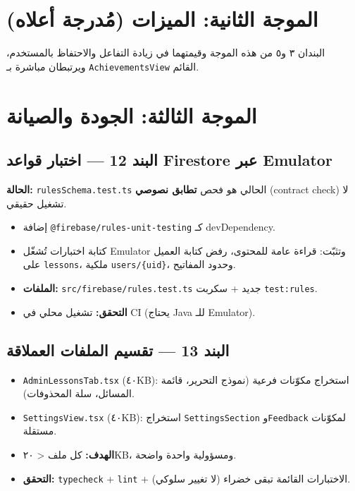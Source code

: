 \documentclass[11pt]{article}
\begin{document}
\section{الموجة الثانية: الميزات (مُدرجة أعلاه)}

البندان ٣ و٥ من هذه الموجة وقيمتهما في زيادة التفاعل والاحتفاظ بالمستخدم،
ويرتبطان مباشرة بـ \texttt{AchievementsView} القائم.

\section{الموجة الثالثة: الجودة والصيانة}

\subsection{البند 12 — اختبار قواعد Firestore عبر Emulator}

\begin{notebox}
\textbf{الحالة:} \texttt{rulesSchema.test.ts} الحالي هو فحص \textbf{تطابق نصوصي} (contract check) لا تشغيل حقيقي.
\end{notebox}

\begin{itemize}
  \item إضافة \texttt{@firebase/rules-unit-testing} كـ devDependency.
  \item كتابة اختبارات تُشغّل Emulator وتثبّت: قراءة عامة للمحتوى، رفض كتابة العميل على \texttt{lessons}،
        ملكية \texttt{users/\{uid\}}، وحدود المفاتيح.
  \item \textbf{الملفات:} \texttt{src/firebase/rules.test.ts} جديد + سكربت \texttt{test:rules}.
  \item \textbf{التحقق:} تشغيل محلي في CI (يحتاج Java للـ Emulator).
\end{itemize}

\subsection{البند 13 — تقسيم الملفات العملاقة}

\begin{itemize}
  \item \texttt{AdminLessonsTab.tsx} (٤٠KB): استخراج مكوّنات فرعية (نموذج التحرير، قائمة المسائل، سلة المحذوفات).
  \item \texttt{SettingsView.tsx} (٤٠KB): استخراج \texttt{SettingsSection} و\texttt{Feedback} لمكوّنات مستقلة.
  \item \textbf{الهدف:} كل ملف < ٢٠KB، ومسؤولية واحدة واضحة.
  \item \textbf{التحقق:} \texttt{typecheck} + \texttt{lint} + الاختبارات القائمة تبقى خضراء (لا تغيير سلوكي).
\end{itemize}
\end{document}
